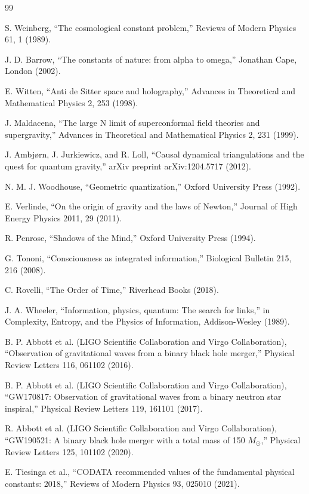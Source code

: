 \documentclass[12pt,a4paper]{article}
\theoremstyle{plain}
\theoremstyle{definition}
\begin{document}

\begin{thebibliography}{99}

S. Weinberg, ``The cosmological constant problem,'' Reviews of Modern Physics 61, 1 (1989).

J. D. Barrow, ``The constants of nature: from alpha to omega,'' Jonathan Cape, London (2002).

E. Witten, ``Anti de Sitter space and holography,'' Advances in Theoretical and Mathematical Physics 2, 253 (1998).

J. Maldacena, ``The large N limit of superconformal field theories and supergravity,'' Advances in Theoretical and Mathematical Physics 2, 231 (1999).

J. Ambjørn, J. Jurkiewicz, and R. Loll, ``Causal dynamical triangulations and the quest for quantum gravity,'' arXiv preprint arXiv:1204.5717 (2012).

N. M. J. Woodhouse, ``Geometric quantization,'' Oxford University Press (1992).

E. Verlinde, ``On the origin of gravity and the laws of Newton,'' Journal of High Energy Physics 2011, 29 (2011).

R. Penrose, ``Shadows of the Mind,'' Oxford University Press (1994).

G. Tononi, ``Consciousness as integrated information,'' Biological Bulletin 215, 216 (2008).

C. Rovelli, ``The Order of Time,'' Riverhead Books (2018).

J. A. Wheeler, ``Information, physics, quantum: The search for links,'' in Complexity, Entropy, and the Physics of Information, Addison-Wesley (1989).

B. P. Abbott et al. (LIGO Scientific Collaboration and Virgo Collaboration), ``Observation of gravitational waves from a binary black hole merger,'' Physical Review Letters 116, 061102 (2016).

B. P. Abbott et al. (LIGO Scientific Collaboration and Virgo Collaboration), ``GW170817: Observation of gravitational waves from a binary neutron star inspiral,'' Physical Review Letters 119, 161101 (2017).

R. Abbott et al. (LIGO Scientific Collaboration and Virgo Collaboration), ``GW190521: A binary black hole merger with a total mass of 150 $M_\odot$,'' Physical Review Letters 125, 101102 (2020).

E. Tiesinga et al., ``CODATA recommended values of the fundamental physical constants: 2018,'' Reviews of Modern Physics 93, 025010 (2021).

\end{thebibliography}
\end{document}
